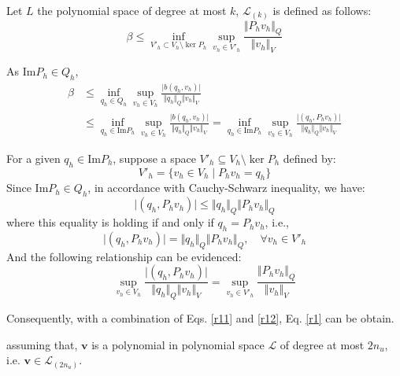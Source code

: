 \begin{thm}
    Let $L$ the polynomial space of degree at most $k$, $\mathcal L_{(k)}$ is defined as follows:
\begin{equation}\label{r1}
    \beta \le \inf_{V'_h \subset V_h \setminus \ker P_h} \sup_{v_h \in V'_h} \frac{\Vert P_h v_h \Vert_Q}{\Vert v_h \Vert_V}
\end{equation}
\end{thm}
\begin{pf}
    As $\mathrm{Im}P_h \in Q_h$,
\begin{equation} \label{r11}
\begin{split}
    \beta &\le \inf_{q_h \in Q_h} \sup_{v_h \in V_h} \frac{\vert b(q_h,v_h) \vert}{\Vert q_h \Vert_Q \Vert v_h \Vert_V} \\
    & \le \inf_{q_h \in \mathrm{Im}P_h} \sup_{v_h \in V_h} \frac{\vert b(q_h,v_h) \vert}{\Vert q_h \Vert_Q \Vert v_h \Vert_V} 
    = \inf_{q_h \in \mathrm{Im}P_h} \sup_{v_h \in V_h} \frac{\vert (q_h,P_h v_h) \vert}{\Vert q_h \Vert_Q \Vert v_h \Vert_V} 
\end{split}
\end{equation}

    For a given $q_h\in \mathrm{Im}P_h$, suppose a space $V'_h \subseteq V_h\setminus \ker P_h$ defined by:
\begin{equation}
    V'_h = \{ v_h \in V_h \; \vert \; P_h v_h = q_h \}
\end{equation}
    Since $\mathrm{Im}P_h \in Q_h$, in accordance with Cauchy-Schwarz inequality, we have:
\begin{equation}
    \vert (q_h,P_h v_h) \vert \le \Vert q_h \Vert_Q \Vert P_h v_h \Vert_Q
\end{equation}
where this equality is holding if and only if $q_h=P_h v_h$, i.e.,
\begin{equation}
    \vert (q_h,P_h v_h) \vert = \Vert q_h \Vert_Q \Vert P_h v_h \Vert_Q, \quad \forall v_h \in V'_h
\end{equation}
And the following relationship can be evidenced:
    \begin{equation}\label{r12}
    \sup_{v_h\in V_h} \frac{\vert (q_h,P_h v_h) \vert}{\Vert q_h \Vert_Q \Vert v_h \Vert_V} =
    \sup_{v_h\in V'_h} \frac{\Vert P_h v_h \Vert_Q}{\Vert v_h \Vert_V} 
\end{equation}

    Consequently, with a combination of Eqs. \eqref{r11} and \eqref{r12}, Eq. \eqref{r1} can be obtain.
\end{pf}
assuming that, $\boldsymbol v$ is a polynomial in polynomial space $\mathcal L$ of degree at most $2n_u$, i.e. $\boldsymbol v \in \mathcal L_{(2n_u)}$. 
